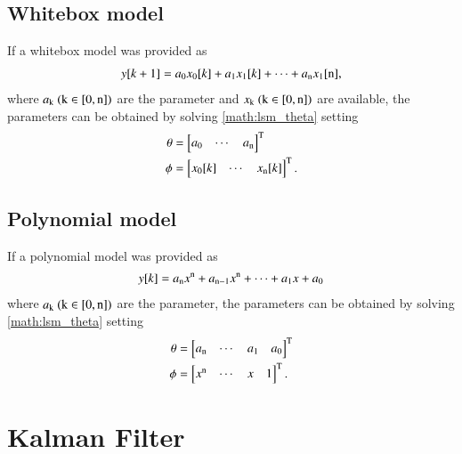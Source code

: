 \documentclass[10pt]{article}
\begin{document}
\subsection{Whitebox model}
If a whitebox model was provided as
\begin{align}
y[k+1] = a_{\rm 0}x_0[k] + a_{\rm 1} x_1[k] + \cdots + a_{\rm n} x_1[{\rm n}],
\end{align}
where $a_{\rm k}\ ({\rm k}\in[0, {\rm n}])$ are the parameter and $x_{\rm k}\ ({\rm k}\in[0, {\rm n}])$ are available, the parameters can be obtained by solving \eqref{math:lsm_theta} setting
\begin{align}
\theta&=\begin{bmatrix}a_0 & \cdots & a_{\rm n} \end{bmatrix}^{\rm T}\\
\phi&=\begin{bmatrix}x_0[k] & \cdots & x_{\rm n}[k]\end{bmatrix}^{\rm T}.
\end{align}

\subsection{Polynomial model} 
If a polynomial model was provided as
\begin{align}
y[k] = a_{\rm n}x^{\rm n} + a_{\rm n-1}x^{\rm n} + \cdots + a_1x + a_0
\end{align}
where $a_{\rm k}\ ({\rm k}\in[0, {\rm n}])$ are the parameter, the parameters can be obtained by solving \eqref{math:lsm_theta} setting
\begin{align}
\theta&=\begin{bmatrix}a_{\rm n} & \cdots & a_1 & a_0 \end{bmatrix}^{\rm T}\\
\phi&=\begin{bmatrix}x^{\rm n} & \cdots & x & 1 \end{bmatrix}^{\rm T}.
\end{align}

\newpage

\section{Kalman Filter}
\end{document}
